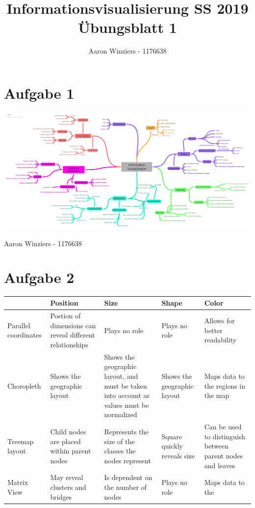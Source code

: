 \documentclass[11pt,a4paper,parskip=half ]{scrartcl}
\author{Aaron Winziers - 1176638}
\title{Informationsvisualisierung SS 2019\\\LARGE{Übungsblatt 1}}
\begin{document}
	\maketitle
	
	\section*{Aufgabe 1}
	\includegraphics[width=\textwidth]{infvis_mindmap.png}
	
	
	\newpage
	Aaron Winziers - 1176638
	\section*{Aufgabe 2}
	\begin{table}[h]
		\begin{tabular}{p{2.5cm}||p{2.5cm}|p{2.5cm}|p{2.5cm}|p{2.5cm}}
			& Position                                                 & Size                                                                                     & Shape                       & Color                                                      \\ \hline \hline
			Parallel coordinates & Postion of dimensions can reveal different relationships & Plays no role                                                                            & Plays no role               & Allows for better readability                              \\ \hline
			Choropleth           & Shows the geographic layout                              & Shows the geographic layout, and must be taken into account as values must be normalized & Shows the geographic layout & Maps data to the regions in the map                        \\ \hline
			Treemap layout       & Child nodes are placed within parent nodes               & Represents the size of the classes the nodes represent                                   & Square quickly reveals size & Can be used to distinguish between parent nodes and leaves \\ \hline
			Matrix View          & May reveal clusters and bridges                          & Is dependent on the number of nodes                                                      & Plays no role               & Maps data to the                                          
		\end{tabular}
	\end{table}
	
\end{document}
